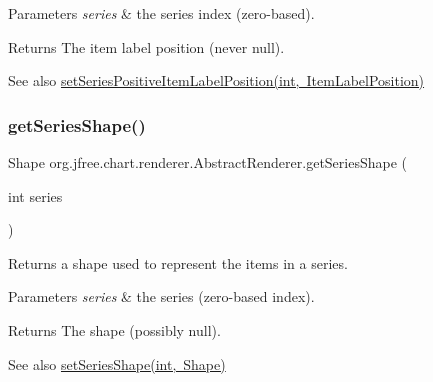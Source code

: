\begin{DoxyParams}{Parameters}
{\em series} & the series index (zero-\/based).\\
\hline
\end{DoxyParams}
\begin{DoxyReturn}{Returns}
The item label position (never {\ttfamily null}).
\end{DoxyReturn}
\begin{DoxySeeAlso}{See also}
\mbox{\hyperlink{classorg_1_1jfree_1_1chart_1_1renderer_1_1_abstract_renderer_afaf8ae06e544670e0ca1247dc965054b}{set\+Series\+Positive\+Item\+Label\+Position(int, Item\+Label\+Position)}} 
\end{DoxySeeAlso}
\mbox{\label{classorg_1_1jfree_1_1chart_1_1renderer_1_1_abstract_renderer_a7e80b0a892d2634a5a925a7023c721bf}} 
\subsubsection{\texorpdfstring{get\+Series\+Shape()}{getSeriesShape()}}
{\footnotesize\ttfamily Shape org.\+jfree.\+chart.\+renderer.\+Abstract\+Renderer.\+get\+Series\+Shape (\begin{DoxyParamCaption}\item[{int}]{series }\end{DoxyParamCaption})}

Returns a shape used to represent the items in a series.


\begin{DoxyParams}{Parameters}
{\em series} & the series (zero-\/based index).\\
\hline
\end{DoxyParams}
\begin{DoxyReturn}{Returns}
The shape (possibly {\ttfamily null}).
\end{DoxyReturn}
\begin{DoxySeeAlso}{See also}
\mbox{\hyperlink{classorg_1_1jfree_1_1chart_1_1renderer_1_1_abstract_renderer_a7e45f32df3421866d30c8e0c7fffe53f}{set\+Series\+Shape(int, Shape)}} 
\end{DoxySeeAlso}
\mbox{\label{classorg_1_1jfree_1_1chart_1_1renderer_1_1_abstract_renderer_aa9fd470dafc2d0596ff1ea4ffcb210bc}} 
